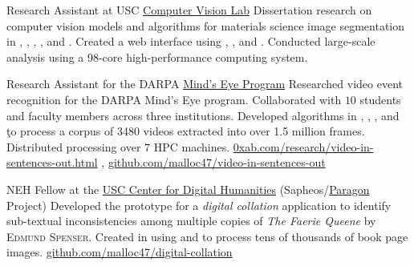 \documentclass[10pt]{article}
\begin{document}
%
{Research Assistant}%
{at}%
{USC \href{http://cvl.cse.sc.edu/}{Computer Vision Lab}}%
{Dissertation research on computer vision models and algorithms for
  materials science image segmentation in \python, \numpy, \scipy,
  \opencv, and \matlab.  Created a web interface using \django, \js,
  and \jquery. Conducted large-scale analysis using a 98-core
  high-performance computing system.}



%
{Research Assistant}%
{for the}%
{DARPA
  \href{https://en.wikipedia.org/wiki/Mind\%27s_Eye_(US_military)}{Mind's
    Eye Program} }%
{Researched video event recognition for the DARPA Mind's Eye
  program.  Collaborated with $10$ students and faculty members
  across three institutions.  Developed algorithms in
  \scheme, \bash, \matlab, and \c to
  process a corpus of 3480 videos extracted into over 1.5 million
  frames. Distributed processing over $7$ HPC machines.
  \href{http://0xab.com/research/video-in-sentences-out.html}{0xab.com/research/video-in-sentences-out.html}
  ,
  \href{https://www.github.com/malloc47/video-in-sentences-out}{github.com/malloc47/video-in-sentences-out}}

%
{NEH Fellow}%
{at the}%
{\href{https://sc.edu/about/centers/digital_humanities/index.php}{USC Center for Digital Humanities}
  (Sapheos/\href{http://sc.edu/about/centers/digital_humanities/projects/paragon.php}{Paragon}
  Project)}%
{Developed the prototype for a \emph{digital collation} application
  to identify sub-textual inconsistencies among multiple copies of
  \emph{The Faerie Queene} by \textsc{Edmund Spenser}.  Created in
  \matlab using  and \opencv to process tens of
  thousands of book page images.
  \href{https://www.github.com/malloc47/digital-collation}{github.com/malloc47/digital-collation}}
\end{document}
